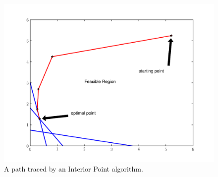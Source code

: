 \begin{figure}
\centering
\includegraphics[width=\textwidth]{interiorPath.pdf}
\caption{A path traced by an Interior Point algorithm.}
\label{intPoint:intPath}
\end{figure}

